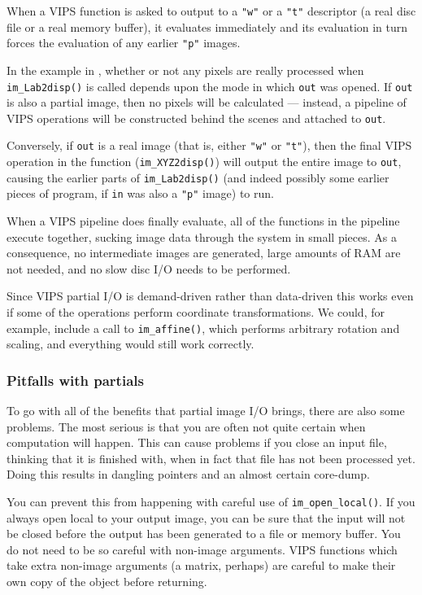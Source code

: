 When a VIPS function is asked to output to a \verb+"w"+ or a \verb+"t"+
descriptor (a real disc file or a real memory buffer), it evaluates
immediately and its evaluation in turn forces the evaluation of any earlier
\verb+"p"+ images.

In the example in , whether or not any pixels are really
processed when \verb+im_Lab2disp()+ is called depends upon the mode in
which \verb+out+ was opened. If \verb+out+ is also a partial image, then
no pixels will be calculated --- instead, a pipeline of VIPS operations
will be constructed behind the scenes and attached to \verb+out+.

Conversely, if \verb+out+ is a real image (that is, either \verb+"w"+
or \verb+"t"+), then the final VIPS operation in the function
(\verb+im_XYZ2disp()+) will output the entire image to \verb+out+, causing
the earlier parts of \verb+im_Lab2disp()+ (and indeed possibly some earlier
pieces of program, if \verb+in+ was also a \verb+"p"+ image) to run.

When a VIPS pipeline does finally evaluate, all of the functions in the
pipeline execute together, sucking image data through the system in small
pieces. As a consequence, no intermediate images are generated, large
amounts of RAM are not needed, and no slow disc I/O needs to be performed.

Since VIPS partial I/O is demand-driven rather than data-driven this works
even if some of the operations perform coordinate transformations.  We could,
for example, include a call to \verb+im_affine()+, which performs
arbitrary rotation and scaling, and everything would still work correctly.

\subsubsection{Pitfalls with partials}

To go with all of the benefits that partial image I/O brings, there are
also some problems. The most serious is that you are often not quite certain
when computation will happen. This can cause problems if you close an input
file, thinking that it is finished with, when in fact that file has not
been processed yet.  Doing this results in dangling pointers and an almost
certain core-dump.

You can prevent this from happening with careful use of
\verb+im_open_local()+.  If you always open local to your output image,
you can be sure that the input will not be closed before the output has been
generated to a file or memory buffer.  You do not need to be so careful with
non-image arguments. VIPS functions which take extra non-image arguments
(a matrix, perhaps) are careful to make their own copy of the object before
returning.

